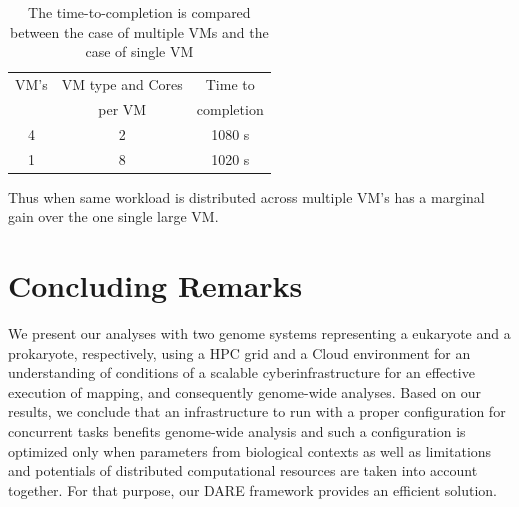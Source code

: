 \documentclass{acm_proc_article-sp}
\begin{document}
 \begin{table}
 \begin{tabular}{|c|c|c|} 
 \hline 
VM's & VM type and Cores  & Time to  \\ 
&per VM& completion\\ 
\hline
4 &  2 & 1080 s \\
1 & 8 & 1020 s \\
 \hline 
 \end{tabular}
 \label{table:cloud VM's} 
 \caption{The time-to-completion is compared between the case of multiple VMs and the case of single VM}
\end{table}

Thus when same workload is distributed across multiple VM's has a
marginal gain over the one single large VM.


\section{Concluding Remarks}
We present our analyses with two genome systems representing a
eukaryote and a prokaryote, respectively, using a HPC grid and a Cloud
environment for an understanding of conditions of a scalable
cyberinfrastructure for an effective execution of mapping, and
consequently genome-wide analyses.  Based on our results, we conclude
that an infrastructure to run with a proper configuration for
concurrent tasks benefits genome-wide analysis and such a
configuration is optimized only when parameters from biological
contexts as well as limitations and potentials of distributed
computational resources are taken into account together.  For that
purpose, our DARE framework provides an efficient solution.





\end{document}
